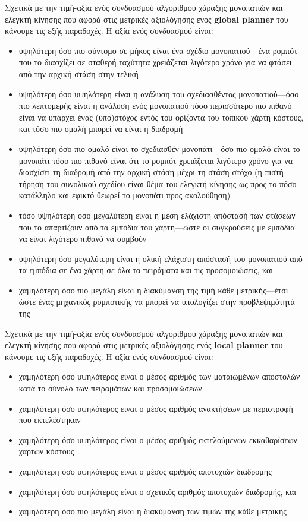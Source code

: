 Σχετικά με την τιμή-αξία ενός συνδυασμού αλγορίθμου χάραξης μονοπατιών
και ελεγκτή κίνησης που αφορά στις μετρικές αξιολόγησης ενός
\textbf{global planner} του κάνουμε τις εξής παραδοχές.
Η αξία ενός συνδυασμού είναι:

\begin{itemize}
  \item υψηλότερη όσο πιο σύντομο σε μήκος είναι ένα σχέδιο μονοπατιού---ένα
        ρομπότ που το διασχίζει σε σταθερή ταχύτητα χρειάζεται λιγότερο χρόνο
        για να φτάσει από την αρχική στάση στην τελική
  \item υψηλότερη όσο υψηλότερη είναι η ανάλυση του σχεδιασθέντος
        μονοπατιού---όσο πιο λεπτομερής είναι η ανάλυση ενός μονοπατιού τόσο
        περισσότερο πιο πιθανό είναι να υπάρχει ένας (υπο)στόχος εντός του
        ορίζοντα του τοπικού χάρτη κόστους, και τόσο πιο ομαλή μπορεί να είναι
        η διαδρομή
  \item υψηλότερη όσο πιο ομαλό είναι το σχεδιασθέν μονοπάτι---όσο πιο ομαλό
        είναι το μονοπάτι τόσο πιο πιθανό είναι ότι το ρομπότ χρειάζεται
        λιγότερο χρόνο για να διασχίσει τη διαδρομή από την αρχική στάση μέχρι
        τη στάση-στόχο (η πιστή τήρηση του συνολικού σχεδίου είναι θέμα του
        ελεγκτή κίνησης ως προς το πόσο κατάλληλο και εφικτό θεωρεί το μονοπάτι
        προς ακολούθηση)
  \item τόσο υψηλότερη όσο μεγαλύτερη είναι η μέση ελάχιστη απόστασή των στάσεων
        που το απαρτίζουν από τα εμπόδια του χάρτη---ώστε οι συγκρούσεις με
        εμπόδια να είναι λιγότερο πιθανό να συμβούν
  \item υψηλότερη όσο μεγαλύτερη είναι η ολική ελάχιστη απόστασή του
        μονοπατιού από τα εμπόδια σε ένα χάρτη σε όλα τα πειράματα και τις
        προσομοιώσεις, και
  \item χαμηλότερη όσο πιο μεγάλη είναι η διακύμανση της τιμή κάθε
        μετρικής---έτσι ώστε ένας μηχανικός ρομποτικής να μπορεί να υπολογίζει
        στην προβλεψιμότητά της
\end{itemize}

Σχετικά με την τιμή-αξία ενός συνδυασμού αλγορίθμου χάραξης μονοπατιών και
ελεγκτή κίνησης που αφορά στις μετρικές αξιολόγησης ενός \textbf{local planner}
του κάνουμε τις εξής παραδοχές. Η αξία ενός συνδυασμού είναι:

\begin{itemize}
  \item χαμηλότερη όσο υψηλότερος είναι ο μέσος αριθμός των ματαιωμένων
        αποστολών κατά το σύνολο των πειραμάτων και προσομοιώσεων
  \item χαμηλότερη όσο υψηλότερος είναι ο μέσος αριθμός ανακτήσεων με περιστροφή
        που εκτελέστηκαν
  \item χαμηλότερη όσο υψηλότερος είναι ο μέσος αριθμός εκτελούμενων
        εκκαθαρίσεων χαρτών κόστους
  \item χαμηλότερη όσο υψηλότερος είναι ο μέσος αριθμός αποτυχιών διαδρομής
  \item χαμηλότερη όσο υψηλότερος είναι ο σχετικός αριθμός αποτυχιών διαδρομής,
        και
  \item χαμηλότερη όσο πιο μεγάλη είναι η διακύμανση των τιμών της κάθε μετρικής
\end{itemize}

